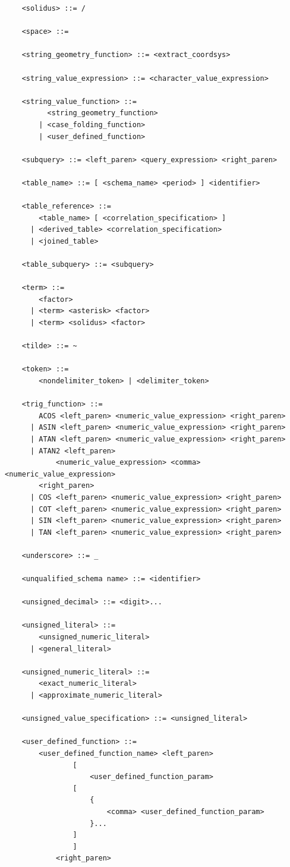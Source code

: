 \documentclass[11pt,a4paper]{ivoa}
\begin{document}
\begin{verbatim}
    <solidus> ::= /

    <space> ::=

    <string_geometry_function> ::= <extract_coordsys>

    <string_value_expression> ::= <character_value_expression>

    <string_value_function> ::=
          <string_geometry_function>
        | <case_folding_function>
        | <user_defined_function>

    <subquery> ::= <left_paren> <query_expression> <right_paren>

    <table_name> ::= [ <schema_name> <period> ] <identifier>

    <table_reference> ::=
        <table_name> [ <correlation_specification> ]
      | <derived_table> <correlation_specification>
      | <joined_table>

    <table_subquery> ::= <subquery>

    <term> ::=
        <factor>
      | <term> <asterisk> <factor>
      | <term> <solidus> <factor>

    <tilde> ::= ~

    <token> ::=
        <nondelimiter_token> | <delimiter_token>

    <trig_function> ::=
        ACOS <left_paren> <numeric_value_expression> <right_paren>
      | ASIN <left_paren> <numeric_value_expression> <right_paren>
      | ATAN <left_paren> <numeric_value_expression> <right_paren>
      | ATAN2 <left_paren>
            <numeric_value_expression> <comma> <numeric_value_expression>
        <right_paren>
      | COS <left_paren> <numeric_value_expression> <right_paren>
      | COT <left_paren> <numeric_value_expression> <right_paren>
      | SIN <left_paren> <numeric_value_expression> <right_paren>
      | TAN <left_paren> <numeric_value_expression> <right_paren>

    <underscore> ::= _

    <unqualified_schema name> ::= <identifier>

    <unsigned_decimal> ::= <digit>...

    <unsigned_literal> ::=
        <unsigned_numeric_literal>
      | <general_literal>

    <unsigned_numeric_literal> ::=
        <exact_numeric_literal>
      | <approximate_numeric_literal>

    <unsigned_value_specification> ::= <unsigned_literal>

    <user_defined_function> ::=
        <user_defined_function_name> <left_paren>
                [
                    <user_defined_function_param>
                [
                    {
                        <comma> <user_defined_function_param>
                    }...
                ]
                ]
            <right_paren>


\end{verbatim}
\end{document}
